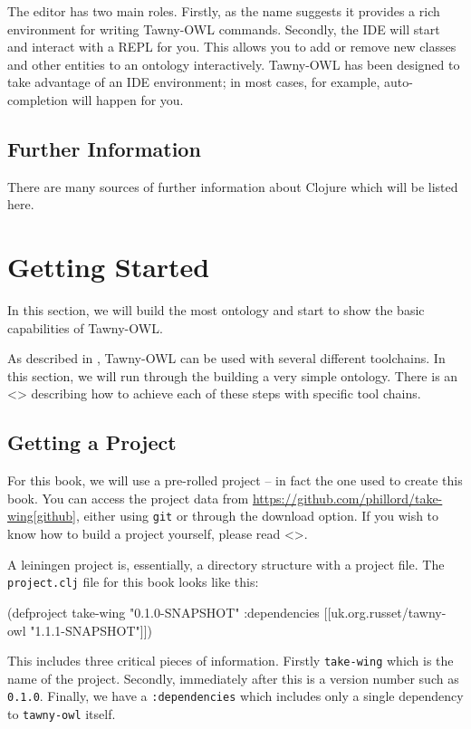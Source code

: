 \documentclass[11pt]{article}
\begin{document}
The editor has two main roles. Firstly, as the name suggests it provides
a rich environment for writing Tawny-OWL commands. Secondly, the IDE
will start and interact with a REPL for you. This allows you to add or
remove new classes and other entities to an ontology interactively.
Tawny-OWL has been designed to take advantage of an IDE environment; in
most cases, for example, auto-completion will happen for you.

\subsection{Further Information}
\label{sec-3-6}

There are many sources of further information about Clojure which will
be listed here.


\section{Getting Started}
\label{sec-4}

In this section, we will build the most ontology and start to show the
basic capabilities of Tawny-OWL.

As described in \label{/the/environment-the-environment}, Tawny-OWL can be
used with several different toolchains. In this section, we will run
through the building a very simple ontology. There is an <> describing
how to achieve each of these steps with specific tool chains.

\subsection{Getting a Project}
\label{sec-4-1}

For this book, we will use a pre-rolled project -- in fact the one used
to create this book. You can access the project data from
\url{https://github.com/phillord/take-wing[github}], either using \texttt{git} or
through the download option. If you wish to know how to build a project
yourself, please read <>.

A leiningen project is, essentially, a directory structure with a
project file. The \texttt{project.clj} file for this book looks like this:

\begin{tawny}
(defproject take-wing "0.1.0-SNAPSHOT"
  :dependencies [[uk.org.russet/tawny-owl "1.1.1-SNAPSHOT"]])
\end{tawny}

This includes three critical pieces of information. Firstly \texttt{take-wing}
which is the name of the project. Secondly, immediately after this is a
version number such as \texttt{0.1.0}. Finally, we have a \texttt{:dependencies} which
includes only a single dependency to \texttt{tawny-owl} itself.
\end{document}
